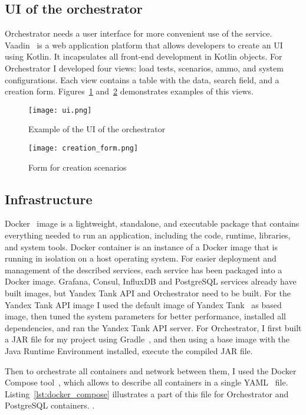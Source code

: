 \subsection{UI of the orchestrator}\label{subsec:ui-of-the-orchestrator}
Orchestrator needs a user interface for more convenient use of the service. Vaadin~\cite{vaadin} is a web application platform that allows developers to create an UI using Kotlin. It incapsulates all front-end development in Kotlin objects. For Orchestrator I developed four views: load tests, scenarios, ammo, and system configurations. Each view contains a table with the data, search field, and a creation form. Figures~\ref{fig:ui} and~\ref{fig:form} demonstrates examples of this views.\begin{figure}[t]
    \centering
    \texttt{[image: ui.png]}
    \caption{Example of the UI of the orchestrator}
    \label{fig:ui}
\end{figure}
\begin{figure}[t]
    \centering
    \texttt{[image: creation\_form.png]}
    \caption{Form for creation scenarios}
    \label{fig:form}
\end{figure}

\subsection{Infrastructure}\label{subsec:infrastructure}
Docker~\cite{docker} image is a lightweight, standalone, and executable package that contains everything needed to run an application, including the code, runtime, libraries, and system tools. Docker container is an instance of a Docker image that is running in isolation on a host operating system.
For easier deployment and management of the described services, each service has been packaged into a Docker image. Grafana, Consul, InfluxDB and PostgreSQL services already have built images, but Yandex Tank API and Orchestrator need to be built. For the Yandex Tank API image I used the default image of Yandex Tank~\cite{yandex_tank_image} as based image, then tuned the system parameters for better performance, installed all dependencies, and ran the Yandex Tank API server. For Orchestrator, I first built a JAR file for my project using Gradle~\cite{gradle}, and then using a base image with the Java Runtime Environment installed, execute the compiled JAR file.

Then to orchestrate all containers and network between them, I used the Docker Compose tool~\cite{docker_compose}, which allows to describe all containers in a single YAML~\cite{yaml} file. Listing~\ref{lst:docker_compose} illustrates a part of this file for Orchestrator and PostgreSQL containers.
.

